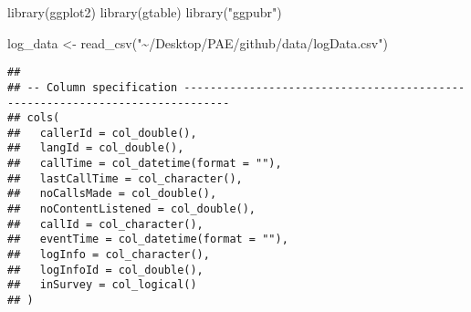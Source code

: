 \documentclass[
]{article}
\newenvironment{Shaded}{\begin{snugshade}}{\end{snugshade}}
\newcommand{\FunctionTok}[1]{\textcolor[rgb]{0.00,0.00,0.00}{#1}}
\newcommand{\NormalTok}[1]{#1}
\newcommand{\OtherTok}[1]{\textcolor[rgb]{0.56,0.35,0.01}{#1}}
\newcommand{\StringTok}[1]{\textcolor[rgb]{0.31,0.60,0.02}{#1}}
\begin{document}
\begin{Shaded}
\begin{Highlighting}[]
\FunctionTok{library}\NormalTok{(ggplot2)}
\FunctionTok{library}\NormalTok{(gtable)}
\FunctionTok{library}\NormalTok{(}\StringTok{"ggpubr"}\NormalTok{)}

\NormalTok{log\_data }\OtherTok{\textless{}{-}} \FunctionTok{read\_csv}\NormalTok{(}\StringTok{"\textasciitilde{}/Desktop/PAE/github/data/logData.csv"}\NormalTok{)}
\end{Highlighting}
\end{Shaded}

\begin{verbatim}
## 
## -- Column specification -----------------------------------------------------------------------------
## cols(
##   callerId = col_double(),
##   langId = col_double(),
##   callTime = col_datetime(format = ""),
##   lastCallTime = col_character(),
##   noCallsMade = col_double(),
##   noContentListened = col_double(),
##   callId = col_character(),
##   eventTime = col_datetime(format = ""),
##   logInfo = col_character(),
##   logInfoId = col_double(),
##   inSurvey = col_logical()
## )
\end{verbatim}
\end{document}
